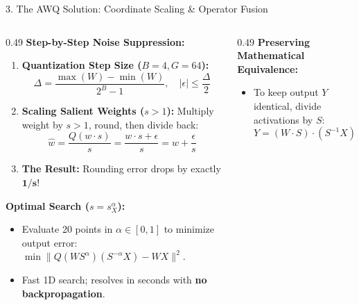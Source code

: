 \documentclass[aspectratio=169, 10pt]{beamer}
\begin{document}
\begin{frame}{3. The AWQ Solution: Coordinate Scaling \& Operator Fusion}
  \vspace{-0.2cm}
  \begin{columns}[T]
    \begin{column}{0.49\textwidth}
      \footnotesize
      \textbf{Step-by-Step Noise Suppression:}
      \begin{enumerate}
        \setlength{\itemsep}{0.05em}
        \item \textbf{Quantization Step Size ($B=4, G=64$):}
        \[
          \Delta = \frac{\max(W) - \min(W)}{2^B - 1}, \quad |\epsilon| \le \frac{\Delta}{2}
        \]
        \item \textbf{Scaling Salient Weights ($s > 1$):}
        Multiply weight by $s > 1$, round, then divide back:
        \[
          \hat{w} = \frac{Q(w \cdot s)}{s} = \frac{w \cdot s + \epsilon}{s} = w + \frac{\epsilon}{s}
        \]
        \item \textbf{The Result:} Rounding error drops by exactly $\mathbf{1/s}$!
      \end{enumerate}

      \vspace{0.06cm}
      \textbf{Optimal Search ($s = s_X^\alpha$):}
      \begin{itemize}
        \item Evaluate 20 points in $\alpha \in [0, 1]$ to minimize output error: $\min \| Q(W S^\alpha)(S^{-\alpha} X) - W X \|^2$.
        \item Fast 1D search; resolves in seconds with \textbf{no backpropagation}.
      \end{itemize}
    \end{column}

    \begin{column}{0.49\textwidth}
      \footnotesize
      \textbf{Preserving Mathematical Equivalence:}
      \begin{itemize}
        \item To keep output $Y$ identical, divide activations by $S$:
        \[
          Y = (W \cdot S) \cdot (S^{-1} X) \equiv W X
        \]
      \end{itemize}


\end{column}
\end{columns}
\end{frame}
\end{document}
